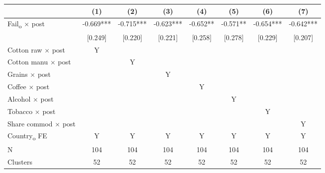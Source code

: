 {
\def\sym#1{\ifmmode^{#1}\else\(^{#1}\)\fi}
\begin{tabular}{l*{7}{c}}
\toprule
            &\multicolumn{1}{c}{(1)}   &\multicolumn{1}{c}{(2)}   &\multicolumn{1}{c}{(3)}   &\multicolumn{1}{c}{(4)}   &\multicolumn{1}{c}{(5)}   &\multicolumn{1}{c}{(6)}   &\multicolumn{1}{c}{(7)}   \\
\midrule
Fail\textsubscript{o} $\times$ post&      -0.669***&      -0.715***&      -0.623***&      -0.652** &      -0.571** &      -0.654***&      -0.642***\\
            &     [0.249]   &     [0.220]   &     [0.221]   &     [0.258]   &     [0.278]   &     [0.229]   &     [0.207]   \\
Cotton raw $\times$ post &           Y   &               &               &               &               &               &               \\
Cotton manu $\times$ post &               &           Y   &               &               &               &               &               \\
Grains $\times$ post &               &               &           Y   &               &               &               &               \\
Coffee $\times$ post &               &               &               &           Y   &               &               &               \\
Alcohol $\times$ post &               &               &               &               &           Y   &               &               \\
Tobacco $\times$ post &               &               &               &               &               &           Y   &               \\
Share commod $\times$ post &               &               &               &               &               &               &           Y   \\
Country\textsubscript{o} FE&           Y   &           Y   &           Y   &           Y   &           Y   &           Y   &           Y   \\
\midrule
N           &         104   &         104   &         104   &         104   &         104   &         104   &         104   \\
Clusters    &          52   &          52   &          52   &          52   &          52   &          52   &          52   \\
\bottomrule
\end{tabular}
}
